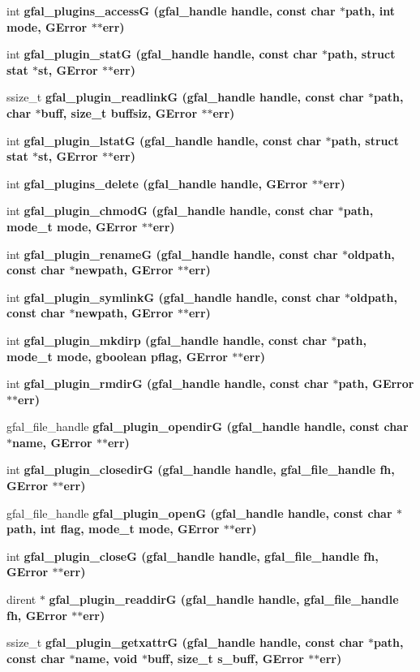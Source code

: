 \begin{CompactItemize}
\item 
int \bf{gfal\_\-plugins\_\-access\-G} (gfal\_\-handle handle, const char $\ast$path, int mode, GError $\ast$$\ast$err)
\item 
int \bf{gfal\_\-plugin\_\-stat\-G} (gfal\_\-handle handle, const char $\ast$path, struct stat $\ast$st, GError $\ast$$\ast$err)
\item 
ssize\_\-t \bf{gfal\_\-plugin\_\-readlink\-G} (gfal\_\-handle handle, const char $\ast$path, char $\ast$buff, size\_\-t buffsiz, GError $\ast$$\ast$err)
\item 
int \bf{gfal\_\-plugin\_\-lstat\-G} (gfal\_\-handle handle, const char $\ast$path, struct stat $\ast$st, GError $\ast$$\ast$err)
\item 
int \bf{gfal\_\-plugins\_\-delete} (gfal\_\-handle handle, GError $\ast$$\ast$err)
\item 
int \bf{gfal\_\-plugin\_\-chmod\-G} (gfal\_\-handle handle, const char $\ast$path, mode\_\-t mode, GError $\ast$$\ast$err)
\item 
int \bf{gfal\_\-plugin\_\-rename\-G} (gfal\_\-handle handle, const char $\ast$oldpath, const char $\ast$newpath, GError $\ast$$\ast$err)
\item 
int \bf{gfal\_\-plugin\_\-symlink\-G} (gfal\_\-handle handle, const char $\ast$oldpath, const char $\ast$newpath, GError $\ast$$\ast$err)
\item 
int \bf{gfal\_\-plugin\_\-mkdirp} (gfal\_\-handle handle, const char $\ast$path, mode\_\-t mode, gboolean pflag, GError $\ast$$\ast$err)
\item 
int \bf{gfal\_\-plugin\_\-rmdir\-G} (gfal\_\-handle handle, const char $\ast$path, GError $\ast$$\ast$err)
\item 
gfal\_\-file\_\-handle \bf{gfal\_\-plugin\_\-opendir\-G} (gfal\_\-handle handle, const char $\ast$name, GError $\ast$$\ast$err)
\item 
int \bf{gfal\_\-plugin\_\-closedir\-G} (gfal\_\-handle handle, gfal\_\-file\_\-handle fh, GError $\ast$$\ast$err)
\item 
gfal\_\-file\_\-handle \bf{gfal\_\-plugin\_\-open\-G} (gfal\_\-handle handle, const char $\ast$path, int flag, mode\_\-t mode, GError $\ast$$\ast$err)
\item 
int \bf{gfal\_\-plugin\_\-close\-G} (gfal\_\-handle handle, gfal\_\-file\_\-handle fh, GError $\ast$$\ast$err)
\item 
dirent $\ast$ \bf{gfal\_\-plugin\_\-readdir\-G} (gfal\_\-handle handle, gfal\_\-file\_\-handle fh, GError $\ast$$\ast$err)
\item 
ssize\_\-t \bf{gfal\_\-plugin\_\-getxattr\-G} (gfal\_\-handle handle, const char $\ast$path, const char $\ast$name, void $\ast$buff, size\_\-t s\_\-buff, GError $\ast$$\ast$err)\label{gfal__common__plugin_8c_de1aadc6ff10f7fef83cb57a21ef1406}


\end{CompactItemize}
